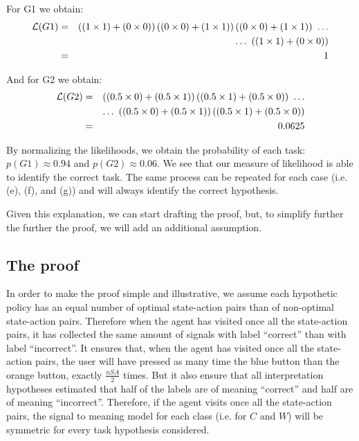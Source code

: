 For G1 we obtain:
%
\begin{eqnarray}
\mathcal{L}(G1) &=& \left((1\times1)+(0\times0)\right)\left((0\times0)+(1\times1)\right)\left((0\times0)+(1\times1)\right)~\ldots  \nonumber \\
&& \ldots~\left((1\times1)+(0\times0)\right)  \nonumber \\
&=& 1 \nonumber
\end{eqnarray}

And for G2 we obtain:
%
\begin{eqnarray}
\mathcal{L}(G2) &=& \left((0.5\times0)+(0.5\times1)\right)\left((0.5\times1)+(0.5\times0)\right)~\ldots  \nonumber \\
&& \ldots~\left((0.5\times0)+(0.5\times1)\right)\left((0.5\times1)+(0.5\times0)\right) \nonumber \\
&=& 0.0625 \nonumber
\end{eqnarray}

By normalizing the likelihoods, we obtain the probability of each task: $p(G1) \approx 0.94$ and $p(G2) \approx 0.06$. We see that our measure of likelihood is able to identify the correct task. The same process can be repeated for each case (i.e. (e), (f), and (g)) and will always identify the correct hypothesis.

Given this explanation, we can start drafting the proof, but, to simplify further the further the proof, we will add an additional assumption.

\subsection{The proof}

In order to make the proof simple and illustrative, we assume each hypothetic policy has an equal number of optimal state-action pairs than of non-optimal state-action pairs. Therefore when the agent has visited once all the state-action pairs, it has collected the same amount of signals with label ``correct'' than with label ``incorrect''. It ensures that, when the agent has visited once all the state-action pairs, the user will have pressed as many time the blue button than the orange button, exactly $\frac{nSA}{2}$ times. But it also ensure that all interpretation hypotheses estimated that half of the labels are of meaning ``correct'' and half are of meaning ``incorrect''. Therefore, if the agent visits once all the state-action pairs, the signal to meaning model for each class (i.e. for $C$ and $W$) will be symmetric for every task hypothesis considered. 

